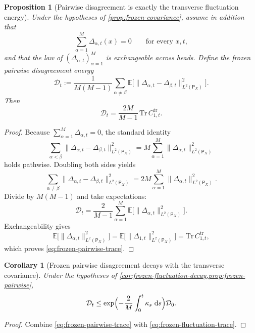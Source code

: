 \documentclass[11pt]{article}
\newtheorem{proposition}[theorem]{Proposition}
\newtheorem{corollary}[theorem]{Corollary}
\theoremstyle{definition}
\newcommand{\E}{\mathbb{E}}
\newcommand{\dd}{\,\mathrm{d}}
\begin{document}
\begin{proposition}[Pairwise disagreement is exactly the transverse fluctuation energy]
\label{prop:frozen-pairwise}
Under the hypotheses of \cref{prop:frozen-covariance}, assume in addition that
\[
  \sum_{\alpha=1}^M \Delta_{\alpha,t}(x)=0
  \qquad
  \text{for every }x,t,
\]
and that the law of $(\Delta_{\alpha,t})_{\alpha=1}^M$ is exchangeable across heads.
Define the frozen pairwise disagreement energy
\[
  \mathcal D_t
  :=
  \frac{1}{M(M-1)}
  \sum_{\alpha\neq\beta}
  \E\bigl[\|\Delta_{\alpha,t}-\Delta_{\beta,t}\|_{L^2(\mathsf P_X)}^2\bigr].
\]
Then
\begin{equation}
  \mathcal D_t
  =
  \frac{2M}{M-1}\,
  \mathrm{Tr}\, C_{1,t}^{\mathrm{tr}}.
  \label{eq:frozen-pairwise-trace}
\end{equation}
\end{proposition}

\begin{proof}
Because \(\sum_{\alpha=1}^M \Delta_{\alpha,t}=0\), the standard identity
\[
  \sum_{\alpha<\beta}
  \|\Delta_{\alpha,t}-\Delta_{\beta,t}\|_{L^2(\mathsf P_X)}^2
  =
  M\sum_{\alpha=1}^M
  \|\Delta_{\alpha,t}\|_{L^2(\mathsf P_X)}^2
\]
holds pathwise.
Doubling both sides yields
\[
  \sum_{\alpha\neq\beta}
  \|\Delta_{\alpha,t}-\Delta_{\beta,t}\|_{L^2(\mathsf P_X)}^2
  =
  2M\sum_{\alpha=1}^M
  \|\Delta_{\alpha,t}\|_{L^2(\mathsf P_X)}^2.
\]
Divide by \(M(M-1)\) and take expectations:
\[
  \mathcal D_t
  =
  \frac{2}{M-1}
  \sum_{\alpha=1}^M
  \E\bigl[\|\Delta_{\alpha,t}\|_{L^2(\mathsf P_X)}^2\bigr].
\]
Exchangeability gives
\[
  \E\bigl[\|\Delta_{\alpha,t}\|_{L^2(\mathsf P_X)}^2\bigr]
  =
  \E\bigl[\|\Delta_{1,t}\|_{L^2(\mathsf P_X)}^2\bigr]
  =
  \mathrm{Tr}\, C_{1,t}^{\mathrm{tr}},
\]
which proves \eqref{eq:frozen-pairwise-trace}.
\end{proof}

\begin{corollary}[Frozen pairwise disagreement decays with the transverse covariance]
\label{cor:frozen-pairwise-decay}
Under the hypotheses of \cref{cor:frozen-fluctuation-decay,prop:frozen-pairwise},
\begin{equation}
  \mathcal D_t
  \le
  \exp\Bigl(
    -\frac{2}{M}\int_0^t \kappa_s\,\dd s
  \Bigr)
  \mathcal D_0.
  \label{eq:frozen-pairwise-decay}
\end{equation}
\end{corollary}

\begin{proof}
Combine \cref{eq:frozen-pairwise-trace} with \cref{eq:frozen-fluctuation-trace}.
\end{proof}
\end{document}
